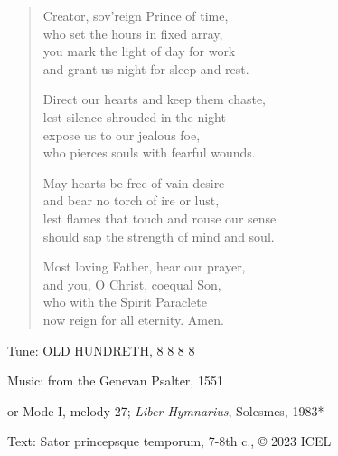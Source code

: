 \hymn

\begin{verse}
Creator, sov’reign Prince of time,\\
who set the hours in fixed array,\\
you mark the light of day for work\\
and grant us night for sleep and rest.

Direct our hearts and keep them chaste,\\
lest silence shrouded in the night\\
expose us to our jealous foe,\\
who pierces souls with fearful wounds.

May hearts be free of vain desire\\
and bear no torch of ire or lust,\\
lest flames that touch and rouse our sense\\
should sap the strength of mind and soul.

Most loving Father, hear our prayer,\\
and you, O Christ, coequal Son,\\
who with the Spirit Paraclete\\
now reign for all eternity. Amen.
\end{verse}

\begin{hymnsource}
Tune: OLD HUNDRETH, 8 8 8 8

Music: from the Genevan Psalter, 1551

or Mode I, melody 27; \emph{Liber Hymnarius}, Solesmes, 1983*

Text: Sator princepsque temporum, 7-8th c., © 2023 ICEL
\end{hymnsource}